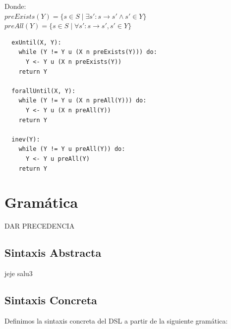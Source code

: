\documentclass[11pt]{article}
\begin{document}
Donde: \\

$preExists(Y) = \{s \in S \; | \; \exists s' : s \rightarrow s' \land s' \in Y\}$ \\
$preAll(Y) = \{s \in S \; | \; \forall s' : s \rightarrow s', s' \in Y\}$

\begin{verbatim}
  exUntil(X, Y):
    while (Y != Y u (X n preExists(Y))) do:
      Y <- Y u (X n preExists(Y))
    return Y
    
  forallUntil(X, Y):
    while (Y != Y u (X n preAll(Y))) do:
      Y <- Y u (X n preAll(Y))
    return Y

  inev(Y):
    while (Y != Y u preAll(Y)) do:
      Y <- Y u preAll(Y)
    return Y
\end{verbatim}

\section{Gramática}

DAR PRECEDENCIA

\subsection{Sintaxis Abstracta}

jeje salu3

\subsection{Sintaxis Concreta}
  Definimos la sintaxis concreta del DSL a partir de la siguiente gramática:
\end{document}
